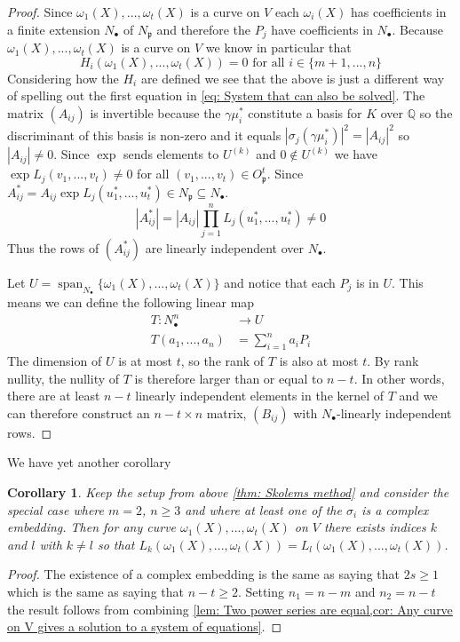 \documentclass{article}
\newcommand{\Span}{\operatorname{span}}
\newtheorem{corollary}{Corollary}[section]
\newcommand{\mfrak}[1]{\mathfrak{#1}}
\newcommand{\mbb}[1]{\mathbb{#1}}
\numberwithin{equation}{section}
\begin{document}
\begin{proof}
    Since $\omega_1(X), ..., \omega_t(X)$ is a curve on $V$ each $\omega_i(X)$ has coefficients in a finite extension $N_\bullet$ of $N_\mfrak p$ and therefore the $P_j$ have coefficients in $N_\bullet$. Because $\omega_1(X), ..., \omega_t(X)$ is a curve on $V$ we know in particular that
    \begin{equation}\label{eq: Last reformulation of initial equations}
        H_i(\omega_1(X), ..., \omega_t(X)) = 0 \text{ for all } i \in \{m+1, ..., n\}
    \end{equation}
    Considering how the $H_i$ are defined we see that the above is just a different way of spelling out the first equation in \cref{eq: System that can also be solved}. The matrix $(A_{ij})$ is invertible because the $\gamma \mu_i^*$ constitute a basis for $K$ over $\mbb{Q}$ so the discriminant of this basis is non-zero and it equals $|\sigma_j(\gamma \mu_i^*)|^2 = |A_{ij}|^2$ so $|A_{ij}| \neq 0$. Since $\exp$ sends elements to $U^{(k)}$ and $0 \notin U^{(k)}$ we have $\exp L_j(v_1, ..., v_t) \neq 0$ for all $(v_1, ..., v_t) \in O_\mfrak p^t$. Since $A_{ij}^* = A_{ij} \exp L_j(u_1^*, ..., u_t^*) \in N_\mfrak p \subseteq N_\bullet$.
    $$|A_{ij}^*| = |A_{ij}| \prod_{j = 1}^n L_j(u_1^*, ..., u_t^*) \neq 0$$
    Thus the rows of $(A_{ij}^*)$ are linearly independent over $N_\bullet$.

    Let $U = \Span_{N_\bullet} \{ \omega_1(X), ..., \omega_t(X) \}$ and notice that each $P_j$ is in $U$. This means we can define the following linear map
    \begin{align*}
        T : N_\bullet^n  & \to U                    \\
        T(a_1, ..., a_n) & = \sum_{i = 1}^n a_i P_i
    \end{align*}
    The dimension of $U$ is at most $t$, so the rank of $T$ is also at most $t$. By rank nullity, the nullity of $T$ is therefore larger than or equal to $n-t$. In other words, there are at least $n-t$ linearly independent elements in the kernel of $T$ and we can therefore construct an $n-t \times n$ matrix, $(B_{ij})$ with $N_\bullet$-linearly independent rows.
\end{proof}

We have yet another corollary
\begin{corollary}\label{cor: Result to prove thues theorem}
    Keep the setup from above \cref{thm: Skolems method} and consider the special case where $m = 2$, $n \geq 3$ and where at least one of the $\sigma_i$ is a complex embedding. Then for any curve $\omega_1(X), ..., \omega_t(X)$ on $V$ there exists indices $k$ and $l$ with $k \neq l$ so that $L_k(\omega_1(X), ..., \omega_t(X)) = L_l(\omega_1(X), ..., \omega_t(X))$.
\end{corollary}
\begin{proof}
    The existence of a complex embedding is the same as saying that $2s \geq 1$ which is the same as saying that $n - t \geq 2$. Setting $n_1 = n-m$ and $n_2 = n-t$ the result follows from combining \cref{lem: Two power series are equal,cor: Any curve on V gives a solution to a system of equations}.
\end{proof}
\end{document}
